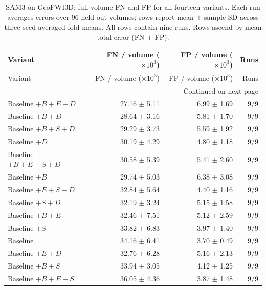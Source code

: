 \documentclass[12pt,a4paper]{article}
\begin{document}
\begingroup\footnotesize{}
\setlength{\tabcolsep}{4pt}
\renewcommand{\arraystretch}{1.12}
\begin{longtable}{@{}lrrr@{}}
\caption{SAM3 on GeoFWI3D: full-volume FN and FP for all fourteen variants. Each run averages errors over 96 held-out volumes; rows report mean $\pm$ sample SD across three seed-averaged fold means. All rows contain nine runs. Rows ascend by mean total error (FN $+$ FP).}
\label{tab:sam3-geo-errors}\\
\hline
Variant & \shortstack{FN / volume\\($\times 10^{3}$)} & \shortstack{FP / volume\\($\times 10^{3}$)} & Runs \\ \hline
\endfirsthead
\hline
Variant & \shortstack{FN / volume\\($\times 10^{3}$)} & \shortstack{FP / volume\\($\times 10^{3}$)} & Runs \\ \hline
\endhead
\hline
\multicolumn{4}{r}{Continued on next page}\\
\endfoot
\hline\endlastfoot
Baseline $+B+E+D$ & 27.16 $\pm$ 5.11 & 6.99 $\pm$ 1.69 & 9/9 \\
Baseline $+B+D$ & 28.64 $\pm$ 3.16 & 5.81 $\pm$ 1.70 & 9/9 \\
Baseline $+B+S+D$ & 29.29 $\pm$ 3.73 & 5.59 $\pm$ 1.92 & 9/9 \\
Baseline $+D$ & 30.19 $\pm$ 4.29 & 4.80 $\pm$ 1.18 & 9/9 \\
Baseline $+B+E+S+D$ & 30.58 $\pm$ 5.39 & 5.41 $\pm$ 2.60 & 9/9 \\
Baseline $+B$ & 29.74 $\pm$ 5.03 & 6.38 $\pm$ 3.08 & 9/9 \\
Baseline $+E+S+D$ & 32.84 $\pm$ 5.64 & 4.40 $\pm$ 1.16 & 9/9 \\
Baseline $+S+D$ & 32.19 $\pm$ 3.24 & 5.15 $\pm$ 1.58 & 9/9 \\
Baseline $+B+E$ & 32.46 $\pm$ 7.51 & 5.12 $\pm$ 2.59 & 9/9 \\
Baseline $+S$ & 33.82 $\pm$ 6.83 & 3.97 $\pm$ 1.40 & 9/9 \\
Baseline & 34.16 $\pm$ 6.41 & 3.70 $\pm$ 0.49 & 9/9 \\
Baseline $+E+D$ & 32.76 $\pm$ 6.28 & 5.16 $\pm$ 2.13 & 9/9 \\
Baseline $+B+S$ & 33.94 $\pm$ 3.05 & 4.12 $\pm$ 1.25 & 9/9 \\
Baseline $+B+E+S$ & 36.05 $\pm$ 4.36 & 3.87 $\pm$ 1.48 & 9/9 \\
\end{longtable}
\endgroup
\end{document}
